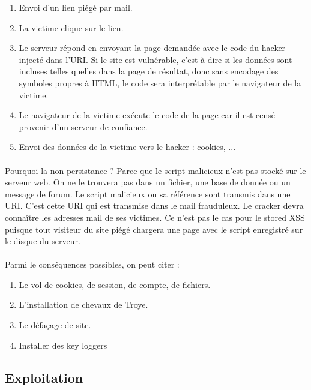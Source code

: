 \begin{enumerate}
	\item   Envoi d'un lien piégé par mail. 
	\item La victime clique sur le lien.
	\item Le serveur répond en envoyant la page demandée avec le code du hacker injecté dans l'URI. Si le site est vulnérable, c'est à dire si les données sont incluses telles quelles dans la page de résultat, donc sans encodage des symboles propres à HTML, le code sera interprétable par le navigateur de la victime.
	\item Le navigateur de la victime exécute le code de la page car il est censé provenir d'un serveur de confiance. 
	\item Envoi des données de la victime  vers le hacker : cookies, ...
\end{enumerate}
 


\paragraph{} Pourquoi la non persistance ? Parce que le script malicieux n'est pas stocké sur le serveur web. On ne le trouvera pas dans un fichier, une base de donnée ou un message de forum. Le script malicieux ou sa référence sont transmis dans une URI. C'est cette URI qui est transmise dans le mail frauduleux. Le cracker devra connaître les adresses mail de ses victimes. Ce n'est pas le cas pour le stored XSS puisque tout visiteur du site piégé chargera une page avec le script enregistré sur le disque du serveur. 



\paragraph{} Parmi le conséquences possibles, on peut citer :
 

\begin{enumerate}
	\item Le vol de cookies, de session, de compte, de fichiers. 
	\item L'installation de chevaux de Troye.
	\item Le défaçage de site.
	\item Installer des key loggers
\end{enumerate}



\subsection{Exploitation}

